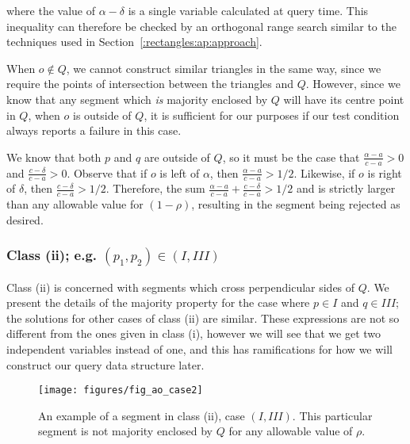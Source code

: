 \noindent where the value of $\alpha - \delta$ is a single variable calculated at query time.  This inequality can therefore be checked by an orthogonal range search similar to the techniques used in Section~\ref{:rectangles:ap:approach}.

When $o \not \in Q$, we cannot construct similar triangles in the same way, since we require the points of intersection between the triangles and $Q$.  However, since we know that any segment which \emph{is} majority enclosed by $Q$ will have its centre point in $Q$, when $o$ is outside of $Q$, it is sufficient for our purposes if our test condition always reports a failure in this case.


We know that both $p$ and $q$ are outside of $Q$, so it must be the case that $\frac{\alpha - a}{c - a} > 0$ and $\frac{c - \delta}{c - a} > 0$. Observe that if $o$ is left of $\alpha$, then $\frac{\alpha - a}{c - a} > 1/2$. Likewise, if $o$ is right of $\delta$, then $\frac{c - \delta}{c - a} > 1/2$. Therefore, the sum $\frac{\alpha - a}{c - a} + \frac{c - \delta}{c - a} > 1/2$ and is strictly larger than any allowable value for $(1 - \rho)$, resulting in the segment being rejected as desired.


\subsubsection*{Class (ii); e.g. $(p_1, p_2) \in (I, III)$}
\label{:rectanges:ao:class2}

Class (ii) is concerned with segments which cross perpendicular sides of $Q$. We present the details of the majority property for the case where $p \in I$ and $q \in III$; the solutions for other cases of class (ii) are similar. These expressions are not so different from the ones given in class (i), however we will see that we get two independent variables instead of one, and this has ramifications for how we will construct our query data structure later.

\begin{figure}[t]
\begin{center}
  \texttt{[image: figures/fig\_ao\_case2]}
  \caption[An example of a segment in class (ii), case $(I, III)$.]{An example of a segment in class (ii), case $(I, III)$. This particular segment is not majority enclosed by $Q$ for any allowable value of $\rho$.}
  \label{fig:rectangles:ao:case2}
\end{center}
\end{figure}

